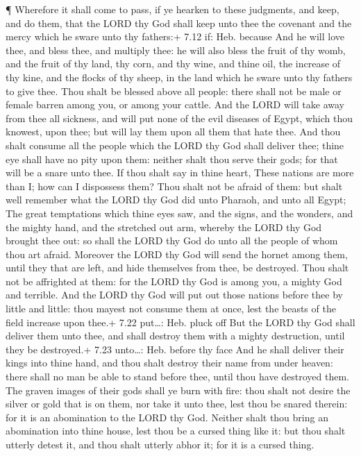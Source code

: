  ¶ Wherefore it shall come to pass, if ye hearken to these
judgments, and keep, and do them, that the LORD thy God shall keep unto
thee the covenant and the mercy which he sware unto thy fathers:+ 7.12
if: Heb. because  And he will love thee, and bless thee,
and multiply thee: he will also bless the fruit of thy womb, and the
fruit of thy land, thy corn, and thy wine, and thine oil, the increase
of thy kine, and the flocks of thy sheep, in the land which he sware
unto thy fathers to give thee.  Thou shalt be blessed above
all people: there shall not be male or female barren among you, or among
your cattle.  And the LORD will take away from thee all
sickness, and will put none of the evil diseases of Egypt, which thou
knowest, upon thee; but will lay them upon all them that hate thee.
 And thou shalt consume all the people which the LORD thy
God shall deliver thee; thine eye shall have no pity upon them: neither
shalt thou serve their gods; for that will be a snare unto thee.
 If thou shalt say in thine heart, These nations are more
than I; how can I dispossess them?  Thou shalt not be
afraid of them: but shalt well remember what the LORD thy God did unto
Pharaoh, and unto all Egypt;  The great temptations which
thine eyes saw, and the signs, and the wonders, and the mighty hand, and
the stretched out arm, whereby the LORD thy God brought thee out: so
shall the LORD thy God do unto all the people of whom thou art afraid.
 Moreover the LORD thy God will send the hornet among them,
until they that are left, and hide themselves from thee, be destroyed.
 Thou shalt not be affrighted at them: for the LORD thy God
is among you, a mighty God and terrible.  And the LORD thy
God will put out those nations before thee by little and little: thou
mayest not consume them at once, lest the beasts of the field increase
upon thee.+ 7.22 put\ldots: Heb. pluck off  But the LORD
thy God shall deliver them unto thee, and shall destroy them with a
mighty destruction, until they be destroyed.+ 7.23 unto\ldots: Heb.
before thy face  And he shall deliver their kings into
thine hand, and thou shalt destroy their name from under heaven: there
shall no man be able to stand before thee, until thou have destroyed
them.  The graven images of their gods shall ye burn with
fire: thou shalt not desire the silver or gold that is on them, nor take
it unto thee, lest thou be snared therein: for it is an abomination to
the LORD thy God.  Neither shalt thou bring an abomination
into thine house, lest thou be a cursed thing like it: but thou shalt
utterly detest it, and thou shalt utterly abhor it; for it is a cursed
thing.

